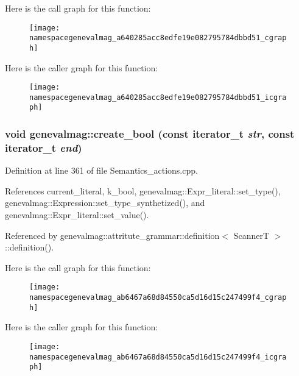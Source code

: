 Here is the call graph for this function:\nopagebreak
\begin{figure}[H]
\begin{center}
\leavevmode
\texttt{[image: namespacegenevalmag\_a640285acc8edfe19e082795784dbbd51\_cgraph]}
\end{center}
\end{figure}




Here is the caller graph for this function:\nopagebreak
\begin{figure}[H]
\begin{center}
\leavevmode
\texttt{[image: namespacegenevalmag\_a640285acc8edfe19e082795784dbbd51\_icgraph]}
\end{center}
\end{figure}


\hypertarget{namespacegenevalmag_ab6467a68d84550ca5d16d15c247499f4}{
\subsubsection[{create\_\-bool}]{\setlength{\rightskip}{0pt plus 5cm}void genevalmag::create\_\-bool (const iterator\_\-t {\em str}, \/  const iterator\_\-t {\em end})}}
\label{namespacegenevalmag_ab6467a68d84550ca5d16d15c247499f4}


Definition at line 361 of file Semantics\_\-actions.cpp.



References current\_\-literal, k\_\-bool, genevalmag::Expr\_\-literal::set\_\-type(), genevalmag::Expression::set\_\-type\_\-synthetized(), and genevalmag::Expr\_\-literal::set\_\-value().



Referenced by genevalmag::attritute\_\-grammar::definition$<$ ScannerT $>$::definition().



Here is the call graph for this function:\nopagebreak
\begin{figure}[H]
\begin{center}
\leavevmode
\texttt{[image: namespacegenevalmag\_ab6467a68d84550ca5d16d15c247499f4\_cgraph]}
\end{center}
\end{figure}




Here is the caller graph for this function:\nopagebreak
\begin{figure}[H]
\begin{center}
\leavevmode
\texttt{[image: namespacegenevalmag\_ab6467a68d84550ca5d16d15c247499f4\_icgraph]}
\end{center}
\end{figure}



